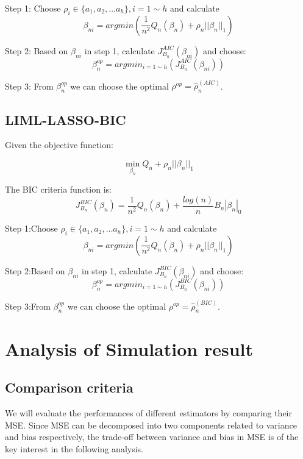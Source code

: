 \documentclass[12pt,pdftex,letterpaper]{article}
\begin{document}
Step 1: Choose $\rho_{i} \in \{a_{1},a_{2},\dots a_{h} \},i=1 \sim h$ and calculate 
     $$\beta_{ni}=argmin({\frac{1}{n^{2}} Q_{n}(\beta_{n})+\rho_{n}||\beta_{n}||_{1}})$$

Step 2: Based on $\beta_{ni}$ in step 1, calculate $J_{B_{n}}^{AIC}(\beta_{ni})$ and choose:
      $$\beta_{n}^{op}=argmin_{i =1 \sim h}(J_{B_{n}}^{AIC}(\beta_{ni}))$$

Step 3: From $\beta_{n}^{op}$ we can choose the optimal $\rho^{op}=\hat{\rho}_{n}^{(AIC)}$.


\subsection{LIML-LASSO-BIC}
Given the objective function:

$$\min_{\beta_{n}} Q_{n}+\rho_{n}||\beta_{n}||_{1}$$

The BIC criteria function is:
$$J_{B_{n}}^{BIC}(\beta_{n})=\frac{1}{n^2}Q_{n}(\beta_{n})+\frac{log(n)}{n}B_{n}|\beta_{n}|_{0}$$

Step 1:Choose $\rho_{i} \in \{a_{1},a_{2},\dots a_{h}\},i=1 \sim h$ and calculate 
     $$\beta_{ni}=argmin(\frac{1}{n^{2}}Q_{n}(\beta_{n})+\rho_{n}||\beta_{n}||_{1})$$

Step 2:Based on $\beta_{ni}$ in step 1, calculate $J_{B_{n}}^{BIC}(\beta_{ni})$ and choose:
      $$\beta_{n}^{op}=argmin_{i =1 \sim h}(J_{B_{n}}^{BIC}(\beta_{ni}))$$

Step 3:From $\beta_{n}^{op}$ we can choose the optimal $\rho^{op}=\hat{\rho}_{n}^{(BIC)}$.


\section{Analysis of Simulation result}
\subsection{Comparison criteria}
    We will evaluate the performances of different estimators by comparing their MSE. Since MSE can be decomposed into two components related to variance and bias respectively, the trade-off between variance and bias in MSE is of the key interest in the following analysis. 
    
\end{document}
